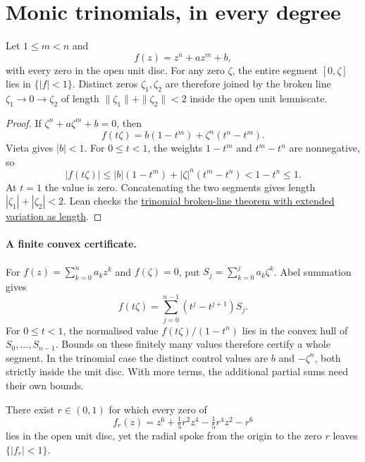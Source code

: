 \documentclass[11pt]{article}
\begin{document}
\section{Monic trinomials, in every degree}
\label{sec:trinomial}

\begin{theorem}
\label{res:trinomial-all-degree}
Let $1\le m<n$ and
\[
 f(z)=z^n+az^m+b,
\]
with every zero in the open unit disc.  For any zero $\zeta$, the entire
segment $[0,\zeta]$ lies in $\{|f|<1\}$.  Distinct zeros $\zeta_1,\zeta_2$
are therefore joined by the broken line $\zeta_1\to0\to\zeta_2$ of length
$\|\zeta_1\|+\|\zeta_2\|<2$ inside the open unit lemniscate.
\end{theorem}

\begin{proof}
If $\zeta^n+a\zeta^m+b=0$, then
\[
 f(t\zeta)=b(1-t^m)+\zeta^n(t^n-t^m).
\]
Vieta gives $|b|<1$.  For $0\le t<1$, the weights $1-t^m$ and $t^m-t^n$
are nonnegative, so
\[
 |f(t\zeta)|\le |b|(1-t^m)+|\zeta|^n(t^m-t^n)
 <1-t^n\le1.
\]
At $t=1$ the value is zero.  Concatenating the two segments gives length
$|\zeta_1|+|\zeta_2|<2$.
Lean checks the \href{https://github.com/wcook04/plectis-erdos/blob/f36a98bf3d3e6f65f1074e3b800e3293d5b8a51a/ErdosProblems/Erdos1041/PaperTrinomial.lean#L38}{trinomial broken-line theorem with extended variation as length}.
\end{proof}

\paragraph{A finite convex certificate.}
For $f(z)=\sum_{k=0}^n a_kz^k$ and $f(\zeta)=0$, put
$S_j=\sum_{k=0}^j a_k\zeta^k$.  Abel summation gives
\[
 f(t\zeta)=\sum_{j=0}^{n-1}(t^j-t^{j+1})S_j.
\]
For $0\le t<1$, the normalised value $f(t\zeta)/(1-t^n)$ lies in the convex
hull of $S_0,\ldots,S_{n-1}$.  Bounds on these finitely many values therefore
certify a whole segment.  In the trinomial case the distinct control values
are $b$ and $-\zeta^n$, both strictly inside the unit disc.  With more terms,
the additional partial sums need their own bounds.

\begin{proposition}
\label{res:sextic-spoke}
There exist $r\in(0,1)$ for which every zero of
\[
 f_r(z)=z^6+\tfrac15 r^2 z^4-\tfrac15 r^4 z^2-r^6
\]
lies in the open unit disc, yet the radial spoke from the origin to the zero
$r$ leaves $\{|f_r|<1\}$.
\end{proposition}
\end{document}
